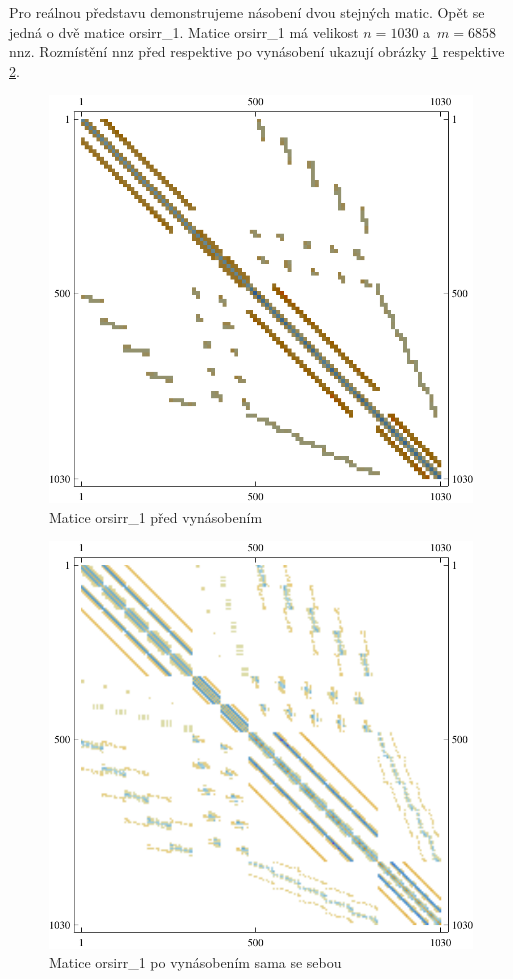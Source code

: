 Pro reálnou představu demonstrujeme násobení dvou stejných matic. Opět se jedná o dvě matice orsirr\_1. Matice orsirr\_1 má velikost $n=1030$ a~$m=6858$ nnz. Rozmístění nnz před respektive po vynásobení ukazují obrázky \ref{fig:befOrsirr1} respektive \ref{fig:aftOrsirr1}.

\begin{figure}[H]
	\includegraphics[width=1.0\textwidth]{./images/orsirr_1_orig}
	\caption{Matice orsirr\_1 před vynásobením}
	\label{fig:befOrsirr1}
\end{figure}

\begin{figure}[H]
	\includegraphics[width=1.0\textwidth]{./images/orsirr_1_mul}
	\caption{Matice orsirr\_1 po vynásobením sama se sebou}
	\label{fig:aftOrsirr1}
\end{figure}

